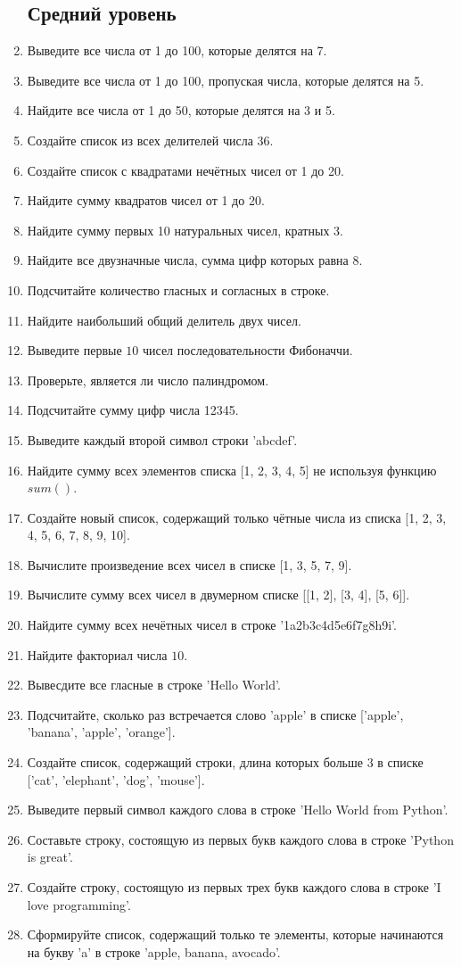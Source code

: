\documentclass[a4,12pt]{article}
\theoremstyle{remark}
\begin{document}
\begin{enumerate}
    \subsection*{Средний уровень}
    \item Выведите все числа от 1 до 100, которые делятся на 7.
    \item Выведите все числа от 1 до 100, пропуская числа, которые делятся на 5.
    \item Найдите все числа от 1 до 50, которые делятся на 3 и 5.
    \item Создайте список из всех делителей числа 36.
    \item Создайте список с квадратами нечётных чисел от 1 до 20.
    \item Найдите сумму квадратов чисел от 1 до 20.
    \item Найдите сумму первых 10 натуральных чисел, кратных 3.
    \item Найдите все двузначные числа, сумма цифр которых равна 8.
    \item Подсчитайте количество гласных и согласных в строке.
    \item Найдите наибольший общий делитель двух чисел.
    \item Выведите первые $10$ чисел последовательности Фибоначчи.
    \item Проверьте, является ли число палиндромом.
    \item Подсчитайте сумму цифр числа 12345.
    \item Выведите каждый второй символ строки 'abcdef'.
    \item Найдите сумму всех элементов списка [1, 2, 3, 4, 5] не используя функцию $sum()$.
    \item Создайте новый список, содержащий только чётные числа из списка [1, 2, 3, 4, 5, 6, 7, 8, 9, 10].
    \item Вычислите произведение всех чисел в списке [1, 3, 5, 7, 9].
    \item Вычислите сумму всех чисел в двумерном списке [[1, 2], [3, 4], [5, 6]].
    \item Найдите сумму всех нечётных чисел в строке '1a2b3c4d5e6f7g8h9i'.
    \item Найдите факториал числа $10$.
    \item Вывесдите все гласные в строке 'Hello World'.
    \item Подсчитайте, сколько раз встречается слово 'apple' в списке ['apple', 'banana', 'apple', 'orange'].
    \item Создайте список, содержащий строки, длина которых больше 3 в списке ['cat', 'elephant', 'dog', 'mouse'].
    \item Выведите первый символ каждого слова в строке 'Hello World from Python'.
    \item Составьте строку, состоящую из первых букв каждого слова в строке 'Python is great'.
    \item Создайте строку, состоящую из первых трех букв каждого слова в строке 'I love programming'.
    \item Сформируйте список, содержащий только те элементы, которые начинаются на букву 'a' в строке 'apple, banana, avocado'.
    

\end{enumerate}
\end{document}
